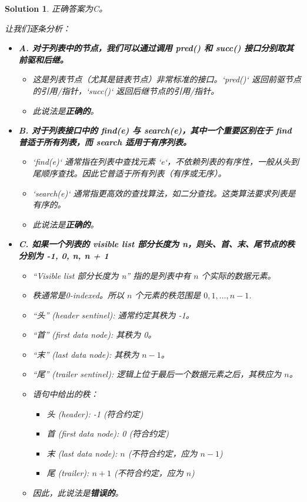 \documentclass[UTF8]{report}
\newtheorem{solution}{Solution}
\theoremstyle{MyLineTheoremStyle} %
\theoremstyle{MyBlockTheoremStyle} %
\theoremstyle{MySubsubsectionStyle} %
\begin{document}
\begin{solution}
正确答案为C。

让我们逐条分析：

\begin{itemize}
    \item \textbf{A. 对于列表中的节点，我们可以通过调用 pred() 和 succ() 接口分别取其前驱和后继。}
    \begin{itemize}
        \item 这是列表节点（尤其是链表节点）非常标准的接口。`pred()` 返回前驱节点的引用/指针，`succ()` 返回后继节点的引用/指针。
        \item 此说法是\textbf{正确的}。
    \end{itemize}

    \item \textbf{B. 对于列表接口中的 find(e) 与 search(e)，其中一个重要区别在于 find 普适于所有列表，而 search 适用于有序列表。}
    \begin{itemize}
        \item `find(e)` 通常指在列表中查找元素 `e`，不依赖列表的有序性，一般从头到尾顺序查找。因此它普适于所有列表（有序或无序）。
        \item `search(e)` 通常指更高效的查找算法，如二分查找。这类算法要求列表是有序的。
        \item 此说法是\textbf{正确的}。
    \end{itemize}

    \item \textbf{C. 如果一个列表的 visible list 部分长度为 n，则头、首、末、尾节点的秩分别为 -1, 0, n, n + 1}
    \begin{itemize}
        \item “Visible list 部分长度为 n” 指的是列表中有 $n$ 个实际的数据元素。
        \item 秩通常是0-indexed。所以 $n$ 个元素的秩范围是 $0, 1, \ldots, n-1$.
        \item “头” (header sentinel): 通常约定其秩为 -1。
        \item “首” (first data node): 其秩为 0。
        \item “末” (last data node): 其秩为 $n-1$。
        \item “尾” (trailer sentinel): 逻辑上位于最后一个数据元素之后，其秩应为 $n$。
        \item 语句中给出的秩：
        \begin{itemize}
            \item 头 (header): -1 (符合约定)
            \item 首 (first data node): 0 (符合约定)
            \item 末 (last data node): $n$ (不符合约定，应为 $n-1$)
            \item 尾 (trailer): $n+1$ (不符合约定，应为 $n$)
        \end{itemize}
        \item 因此，此说法是\textbf{错误的}。
    \end{itemize}


\end{itemize}
\end{solution}
\end{document}
